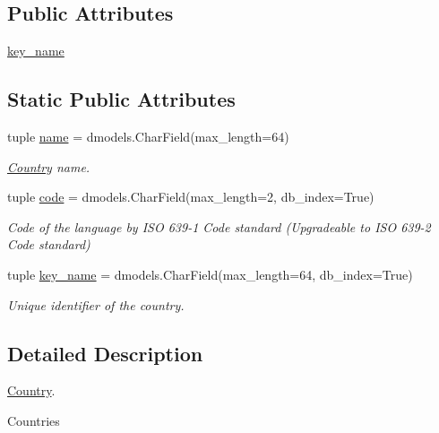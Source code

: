 \subsection*{Public Attributes}
\begin{DoxyCompactItemize}
\item 
\hyperlink{classcore_1_1models_1_1Country_ac21ce3fc1459b072b4fc49d53c525867}{key\-\_\-name}
\end{DoxyCompactItemize}
\subsection*{Static Public Attributes}
\begin{DoxyCompactItemize}
\item 
tuple \hyperlink{classcore_1_1models_1_1Country_abadb165c9cb65ad347d076a20c1d7690}{name} = dmodels.\-Char\-Field(max\-\_\-length=64)
\begin{DoxyCompactList}\small\item\em \hyperlink{classcore_1_1models_1_1Country}{Country} name. \end{DoxyCompactList}\item 
tuple \hyperlink{classcore_1_1models_1_1Country_a0e69789f36a5e3ae61532a9cf69763a5}{code} = dmodels.\-Char\-Field(max\-\_\-length=2, db\-\_\-index=True)
\begin{DoxyCompactList}\small\item\em Code of the language by I\-S\-O 639-\/1 Code standard (Upgradeable to I\-S\-O 639-\/2 Code standard) \end{DoxyCompactList}\item 
tuple \hyperlink{classcore_1_1models_1_1Country_ac21ce3fc1459b072b4fc49d53c525867}{key\-\_\-name} = dmodels.\-Char\-Field(max\-\_\-length=64, db\-\_\-index=True)
\begin{DoxyCompactList}\small\item\em Unique identifier of the country. \end{DoxyCompactList}\end{DoxyCompactItemize}


\subsection{Detailed Description}
\hyperlink{classcore_1_1models_1_1Country}{Country}. 

Countries 

